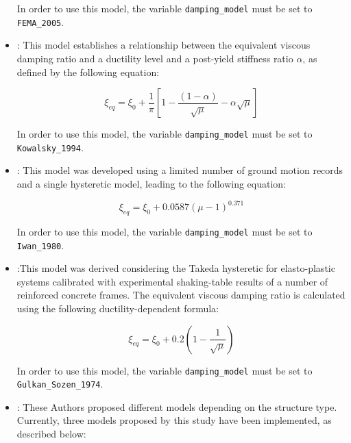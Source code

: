 \begin{itemize}
In order to use this model, the variable \verb=damping_model= must be set to \verb=FEMA_2005=.\\

\item \cite{Kowalsky1994}: This model establishes a relationship between the equivalent viscous damping ratio and a ductility level and a post-yield stiffness ratio $\alpha$, as defined by the following equation:

\begin{equation}
\xi_{eq} = \xi_0 + \frac{1}{\pi}\left[1-\frac{(1-\alpha)}{\sqrt{\mu}} - \alpha\sqrt{\mu} \right]
\end{equation}

In order to use this model, the variable \verb=damping_model= must be set to \verb=Kowalsky_1994=.\\

\item \citep{Iwan1980}: This model was developed using a limited number of ground motion records and a single hysteretic model, leading to the following equation:

\begin{equation}
	\xi_{eq} = \xi_0 + 0.0587\left(\mu-1\right)^0.371
\end{equation}

In order to use this model, the variable \verb=damping_model= must be set to \verb=Iwan_1980=.\\

\item \cite{GulkanSozen1974}:This model was derived considering the Takeda hysteretic for elasto-plastic systems calibrated with experimental shaking-table results of a number of reinforced concrete frames. The equivalent viscous damping ratio is calculated using the following ductility-dependent formula:

\begin{equation}
	\xi_{eq} = \xi_0 + 0.2\left(1- \frac{1}{\sqrt{\mu}}\right)
\end{equation}

In order to use this model, the variable \verb=damping_model= must be set to \verb=Gulkan_Sozen_1974=.\\

\item \cite{PriestleyEtAl2007}: These Authors proposed different models depending on the structure type. Currently, three models proposed by this study have been implemented, as described below: \\


\end{itemize}
